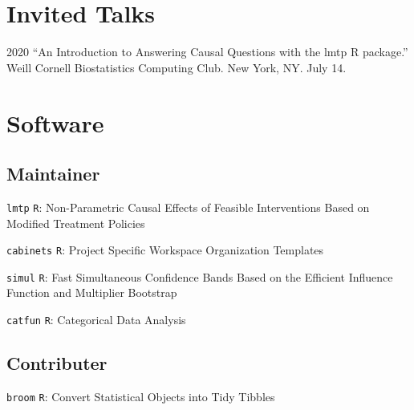 \documentclass[12pt,letterpaper]{report}
\begin{document}
    \section*{Invited Talks}

    \begin{tablist}

        \item[2020] \tab \enquote{An Introduction to Answering Causal Questions with the lmtp R package.} Weill Cornell Biostatistics Computing Club. New York, NY. July 14.

    \end{tablist}
    
    \section*{Software}
    
    \subsection*{Maintainer}
    
    \begin{tablist}
    
    	\item[{\footnotesize \texttt{lmtp}}] \tab \texttt{R}: Non-Parametric Causal Effects of Feasible Interventions Based on Modified Treatment Policies
	
		\item[{\footnotesize \texttt{cabinets}}] \tab \texttt{R}: Project Specific Workspace Organization Templates
	
		\item[{\footnotesize \texttt{simul}}] \tab \texttt{R}: Fast Simultaneous Confidence Bands Based on the Efficient Influence Function and Multiplier Bootstrap
	
		\item[{\footnotesize \texttt{catfun}}] \tab \texttt{R}: Categorical Data Analysis
    
    \end{tablist}
    
    \subsection*{Contributer}
    
    \begin{tablist}
    
    	\item[{\footnotesize \texttt{broom}}] \tab \texttt{R}: Convert Statistical Objects into Tidy Tibbles
    
    \end{tablist}
\end{document}
